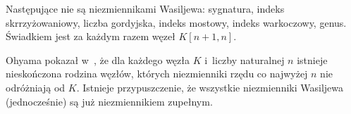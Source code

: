 Następujące nie są niezmiennikami Wasiljewa: sygnatura, indeks skrrzyżowaniowy, liczba gordyjska, indeks mostowy, indeks warkoczowy, genus.
Świadkiem jest za każdym razem węzeł $K[n+1, n]$.

Ohyama pokazał w~\cite{ohyama95}, że dla każdego węzła $K$ i~liczby naturalnej $n$ istnieje nieskończona rodzina węzłów, których niezmienniki rzędu co najwyżej $n$ nie odróżniają od $K$.
Istnieje przypuszczenie, że wszystkie niezmienniki Wasiljewa (jednocześnie) są już niezmiennikiem zupełnym.